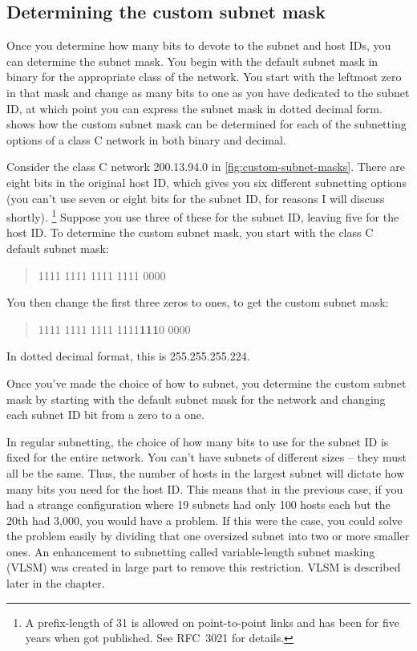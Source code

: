 \subsection{Determining the custom subnet mask}

Once you determine how many bits to devote to the subnet and host IDs,
you can determine the subnet mask. You begin with the default subnet
mask in binary for the appropriate class of the network. You start with
the leftmost zero in that mask and change as many bits to one as you
have dedicated to the subnet ID, at which point you can express the subnet mask in dotted decimal form.
 shows how the custom subnet mask can be determined for each of the
subnetting options of a class C network in both binary and decimal.

Consider the class C network 200.13.94.0 in \cref{fig:custom-subnet-masks}.
There are eight bits in the original host ID, which gives you six different subnetting options
(you can't use seven or eight bits for the subnet ID, for reasons I will discuss shortly).%
   \footnote{A prefix-length of 31 is allowed on point-to-point links and has been for five years when \cite{kozierok05} got published. See RFC~3021 for details.}
Suppose you use three of these for the subnet ID, leaving five for the host ID.
To determine the custom subnet mask, you start with the class C default subnet mask:

\begin{quote}
1111 1111 1111 1111 0000
\end{quote}

You then change the first three zeros to ones, to get the custom subnet mask:

\begin{quote}
1111 1111 1111 1111\quad \textbf{111}0 0000
\end{quote}
In dotted decimal format, this is 255.255.255.224.


\begin{note}
Once you've made the choice of how to subnet, you determine the custom subnet mask by starting with
the default subnet mask for the network and changing each subnet ID bit from a zero to a one.
\end{note}

\begin{note}
In regular subnetting, the choice of how many bits to use for the subnet ID is fixed for the entire network.
You can't have subnets of different sizes -- they must all be the same.
Thus, the number of hosts in the largest subnet will dictate how many bits you need for the host ID.
This means that in the previous case, if you had a strange configuration where 19 subnets had only 100 hosts each but the 20th had 3,000, you would have a problem.
If this were the case, you could solve the problem easily by dividing that one oversized subnet into two or more smaller ones.
An enhancement to subnetting called variable-length subnet masking (VLSM) was created in large part to remove this restriction.
VLSM is described later in the chapter.
\end{note}


